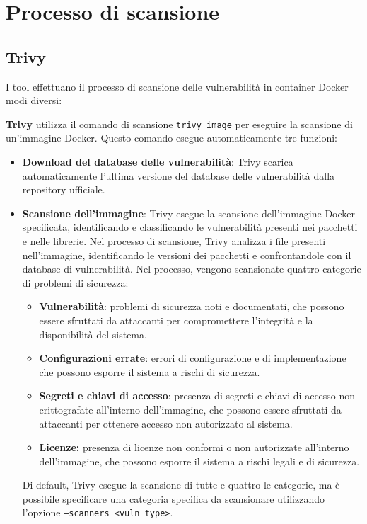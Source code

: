 \section{Processo di scansione}
\subsection{Trivy}
I tool effettuano il processo di scansione delle vulnerabilità in container Docker modi diversi:

\textbf{Trivy} utilizza il comando di scansione \texttt{trivy image} per eseguire la scansione di un'immagine Docker. Questo comando esegue automaticamente tre funzioni:
\begin{itemize}
   \item \textbf{Download del database delle vulnerabilità}: Trivy scarica automaticamente l'ultima versione del database delle vulnerabilità dalla repository ufficiale.
   \item \textbf{Scansione dell'immagine}: Trivy esegue la scansione dell'immagine Docker specificata, identificando e classificando le vulnerabilità presenti nei pacchetti e nelle librerie. Nel processo di scansione, Trivy analizza i file presenti nell'immagine, identificando le versioni dei pacchetti e confrontandole con il database di vulnerabilità. Nel processo, vengono scansionate quattro categorie di problemi di sicurezza:
         \begin{itemize}
            \item \textbf{Vulnerabilità}: problemi di sicurezza noti e documentati, che possono essere sfruttati da attaccanti per compromettere l'integrità e la disponibilità del sistema.
            \item \textbf{Configurazioni errate}: errori di configurazione e di implementazione che possono esporre il sistema a rischi di sicurezza.
            \item \textbf{Segreti e chiavi di accesso}: presenza di segreti e chiavi di accesso non crittografate all'interno dell'immagine, che possono essere sfruttati da attaccanti per ottenere accesso non autorizzato al sistema.
            \item \textbf{Licenze:} presenza di licenze non conformi o non autorizzate all'interno dell'immagine, che possono esporre il sistema a rischi legali e di sicurezza.
         \end{itemize}
         Di default, Trivy esegue la scansione di tutte e quattro le categorie, ma è possibile specificare una categoria specifica da scansionare utilizzando l'opzione \texttt{--scanners <vuln\_type>}.


\end{itemize}
